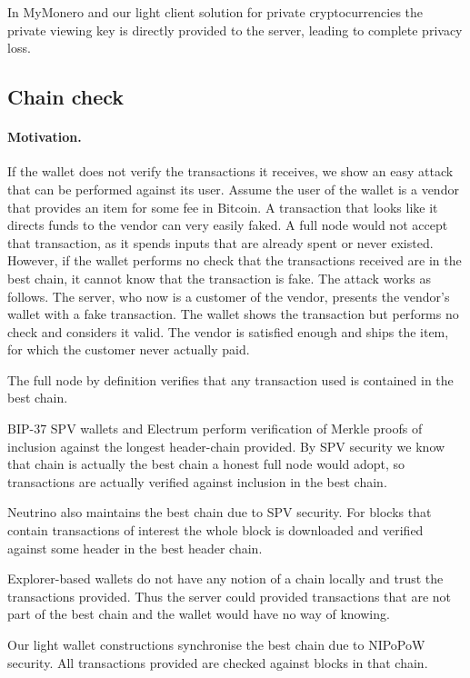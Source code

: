 In MyMonero and our light client solution for private cryptocurrencies the private viewing key is directly provided to the server, leading to complete privacy loss.

\subsection{Chain check}
\paragraph{Motivation.} If the wallet does not verify the transactions it receives, we show an easy attack that can be performed against its user. Assume the user of the wallet is a vendor that provides an item for some fee in Bitcoin. A transaction that looks like it directs funds to the vendor can very easily faked. A full node would not accept that transaction, as it spends inputs that are already spent or never existed. However, if the wallet performs no check that the transactions received are in the best chain, it cannot know that the transaction is fake. The attack works as follows. The server, who now is a customer of the vendor, presents the vendor's wallet with a fake transaction. The wallet shows the transaction but performs no check and considers it valid. The vendor is satisfied enough and ships the item, for which the customer never actually paid.

The full node by definition verifies that any transaction used is contained in the best chain.

BIP-37 SPV wallets and Electrum perform verification of Merkle proofs of inclusion against the longest header-chain provided. By SPV security we know that chain is actually the best chain a honest full node would adopt, so transactions are actually verified against inclusion in the best chain.

Neutrino also maintains the best chain due to SPV security. For blocks that contain transactions of interest the whole block is downloaded and verified against some header in the best header chain.

Explorer-based wallets do not have any notion of a chain locally and trust the transactions provided. Thus the server could provided transactions that are not part of the best chain and the wallet would have no way of knowing.

Our light wallet constructions synchronise the best chain due to NIPoPoW security. All transactions provided are checked against blocks in that chain.

